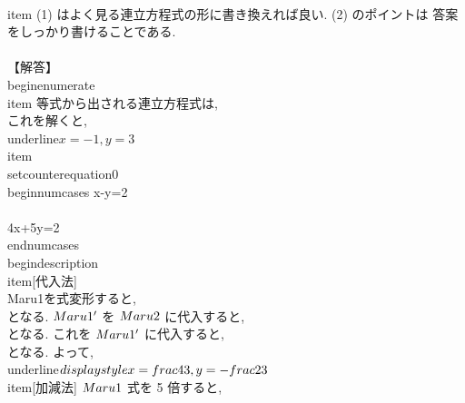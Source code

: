  \\item (1) はよく見る連立方程式の形に書き換えれば良い. (2) のポイントは
       答案をしっかり書けることである. \\\\
       【解答】
       \\begin{enumerate}
	\\item 等式から出される連立方程式は,
	      \\[
	       \\begin{cases}
		4x-y+10=3\\\\
		-2y-3x+6=3
	       \\end{cases}
	      \\]
	      これを解くと, \\underline{$x=-1,y=3$}
	\\item \\setcounter{equation}{0}
	      \\begin{numcases}{}
	       x-y=2 \\\\
	       4x+5y=2
	      \\end{numcases}
	      \\begin{description}
	       \\item[代入法] \\Maru{1}を式変形すると,
			  \\[
			   x=y+2 \\tag{\\Maru{1}'}
			  \\]
			  となる. $\\Maru{1}'$ を $\\Maru{2}$ に代入すると,
			  \\[
			   4(y+2)+5y=2 \\Leftrightarrow y=-\\frac{2}{3}
			  \\]
			  となる. これを $\\Maru{1}'$ に代入すると,
			  \\[
			   x=-\\frac{2}{3}+2=\\frac{4}{3} 
			  \\]
			  となる. よって, \\underline{$\\displaystyle
			  x=\\frac{4}{3}, y=-\\frac{2}{3}$}
	       \\item[加減法] $\\Maru{1}$ 式を 5 倍すると,
